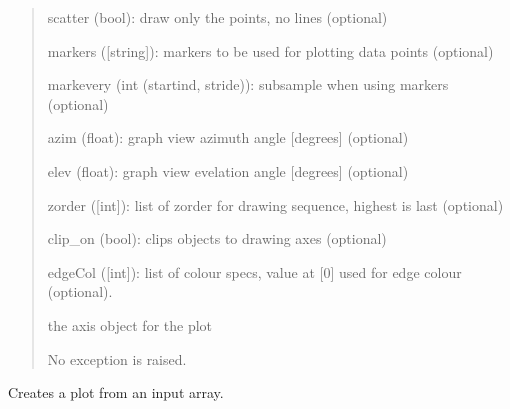 \documentclass[a4paper,10pt,english]{sphinxmanual}
\begin{document}
\begin{fulllineitems}
\begin{fulllineitems}
\begin{quote}
\begin{description}
\begin{DUlineblock}{0em}
\item[] scatter (bool): draw only the points, no lines (optional)
\item[] markers ({[}string{]}): markers to be used for plotting data points (optional)
\item[] markevery (int \textbar{} (startind, stride)): subsample when using markers (optional)
\item[] azim (float): graph view azimuth angle  {[}degrees{]} (optional)
\item[] elev (float): graph view evelation angle  {[}degrees{]} (optional)
\item[] zorder ({[}int{]}): list of zorder for drawing sequence, highest is last (optional)
\item[] clip\_on (bool): clips objects to drawing axes (optional)
\item[] edgeCol ({[}int{]}): list of colour specs, value at {[}0{]} used for edge colour (optional). 
\end{DUlineblock}

\item[{Returns:}] \leavevmode
\begin{DUlineblock}{0em}
\item[] the axis object for the plot
\end{DUlineblock}

\item[{Raises:}] \leavevmode
\begin{DUlineblock}{0em}
\item[] No exception is raised.
\end{DUlineblock}

\end{description}
\end{quote}

\end{fulllineitems}


\begin{fulllineitems}
\label{ryplot:pyradi.ryplot.Plotter.plotArray}
Creates a plot from an input array.


\end{fulllineitems}
\end{fulllineitems}
\end{document}
